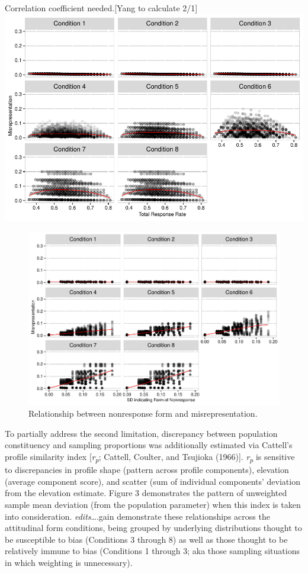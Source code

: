 \documentclass[
  ,man,floatsintext]{apa6}
\begin{document}
Correlation coefficient needed.{[}Yang to calculate 2/1{]}
\includegraphics{Simulation-paper2-20200207_files/figure-latex/Figure1-1.pdf}

\begin{figure}
\centering
\includegraphics{Simulation-paper2-20200207_files/figure-latex/Figure2-1.pdf}
\caption{\label{fig:Figure2}Relationship between nonresponse form and misrepresentation.}
\end{figure}

To partially address the second limitation, discrepancy between population constituency and sampling proportions was additionally estimated via Cattell's profile similarity index {[}\emph{r\textsubscript{p}}; Cattell, Coulter, and Tsujioka (1966){]}. \emph{r\textsubscript{p}} is sensitive to discrepancies in profile shape (pattern across profile components), elevation (average component score), and scatter (sum of individual components' deviation from the elevation estimate. Figure 3 demonstrates the pattern of unweighted sample mean deviation (from the population parameter) when this index is taken into consideration. \emph{edits}\ldots.gain demonstrate these relationships across the attitudinal form conditions, being grouped by underlying distributions thought to be susceptible to bias (Conditions 3 through 8) as well as those thought to be relatively immune to bias (Conditions 1 through 3; aka those sampling situations in which weighting is unnecessary).
\end{document}
